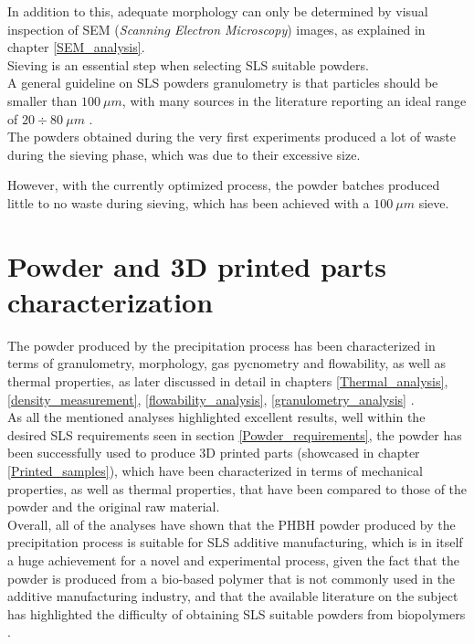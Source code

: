 \documentclass{article}
\begin{document}
    In addition to this, adequate morphology can only be 
    determined by visual inspection of SEM (\textit{Scanning Electron Microscopy}) images, as explained in chapter \ref{SEM_analysis}. \\

    Sieving is an essential step when selecting SLS suitable powders. \\ 
    A general guideline on SLS powders granulometry is that particles should be smaller than $100 \ \mu m$, with many 
    sources in the literature reporting an ideal range of $20 \div 80 \ \mu m$ \autocites{Padovano_SLS_Review}. \\ 

    The powders obtained during the very first experiments produced a lot of waste during the sieving phase, which was due to their excessive size. 

    However, with the currently optimized process, the powder batches produced little to no waste during sieving, which has been achieved 
    with a $100 \ \mu m$ sieve. \\

    \clearpage

    \section{Powder and 3D printed parts characterization\label{powder_characterization}}

    The powder produced by the precipitation process has been characterized in terms of granulometry, morphology, gas pycnometry and flowability, 
    as well as thermal properties, as later discussed in detail in chapters \ref{Thermal_analysis}, \ref{density_measurement}, 
    \ref{flowability_analysis}, \ref{granulometry_analysis} . \\

    As all the mentioned analyses highlighted excellent results, well within the desired SLS requirements seen in section \ref{Powder_requirements}, the powder has been successfully used to produce 3D printed parts
    (showcased in chapter \ref{Printed_samples}), which have been characterized in terms of mechanical properties, as well as thermal properties, that have been 
    compared to those of the powder and the original raw material. \\

    Overall, all of the analyses have shown that the PHBH powder produced by the precipitation process is suitable for SLS additive manufacturing, which is in itself a huge achievement for a 
    novel and experimental process, given the fact that the powder is produced from a bio-based polymer that is not commonly used in the additive manufacturing industry, and that 
    the available literature on the subject has highlighted the difficulty of obtaining SLS suitable powders from biopolymers \autocites{Padovano_SLS_Review}. \\ 
\end{document}
